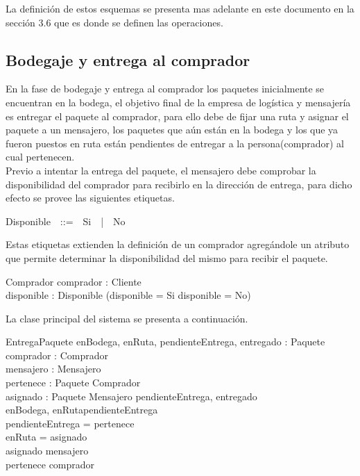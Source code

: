 \documentclass[12pt,a4paper]{article}
\begin{document}
La definición de estos esquemas se presenta mas adelante en este documento en la sección 3.6 que es donde se definen las operaciones.

\subsection{Bodegaje y entrega al comprador}

En la fase de bodegaje y entrega al comprador los paquetes inicialmente se encuentran en la bodega, el objetivo final de la empresa de logística y mensajería es entregar el paquete al comprador, para ello debe de fijar una ruta y asignar el paquete a un mensajero, los paquetes que aún están en la bodega y los que ya fueron puestos en ruta están pendientes de entregar a la persona(comprador) al cual pertenecen.\\

\indent Previo a intentar la entrega del paquete, el mensajero debe comprobar la disponibilidad del comprador para recibirlo en la dirección de entrega, para dicho efecto se provee las siguientes etiquetas.

\begin{zed}
Disponible~~::=~~Si~~|~~No
\end{zed}

Estas etiquetas extienden la definición de un comprador agregándole un atributo que permite determinar la disponibilidad del mismo para recibir el paquete.

\begin{schema}{Comprador}
comprador : Cliente\\
disponible : Disponible
\where
(disponible = Si \lor disponible = No)
\end{schema}

La clase principal del sistema se presenta a continuación.

\begin{schema}{EntregaPaquete}
enBodega, enRuta, pendienteEntrega, entregado : \power Paquete\\
comprador : \power Comprador\\ 
mensajero : \power Mensajero\\
pertenece : Paquete \pfun Comprador\\
asignado : Paquete \pfun Mensajero
\where
\disjoint \langle pendienteEntrega, entregado \rangle\\
\langle enBodega, enRuta\rangle \partition pendienteEntrega \\
pendienteEntrega = \dom pertenece \\
enRuta = \dom asignado \\
\ran asignado \subseteq mensajero \\
\ran pertenece \subseteq comprador
\end{schema}
\end{document}
